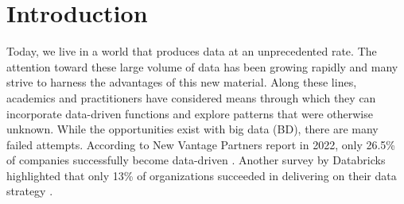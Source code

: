 \documentclass{bmcart}
\begin{document}
\begin{frontmatter}
\begin{abstractbox}

\begin{keyword}
\end{keyword}


\end{abstractbox}
%

\end{frontmatter}




\section{Introduction}


Today, we live in a world that produces data at an unprecedented rate. The attention toward these large volume of data has been growing rapidly and many strive to harness the advantages of this new material. Along these lines, academics and practitioners have considered means through which they can incorporate data-driven functions and explore patterns that were otherwise unknown. While the opportunities exist with big data (BD), there are many failed attempts. According to New Vantage Partners report in 2022, only 26.5\% of companies successfully become data-driven \cite{NewVantageSurvey}. Another survey by Databricks highlighted that only 13\% of organizations succeeded in delivering on their data strategy \cite{DataBricksSurvey}. 
\end{document}
